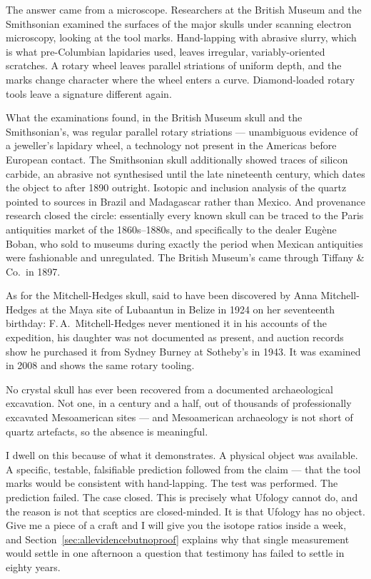 The answer came from a microscope. Researchers at the British Museum and the Smithsonian examined the
surfaces of the major skulls under scanning electron microscopy, looking at the tool marks.  Hand-lapping with
abrasive slurry, which is what pre-Columbian lapidaries used, leaves irregular, variably-oriented
scratches. A rotary wheel leaves parallel striations of uniform depth, and the marks change character
where the wheel enters a curve. Diamond-loaded rotary tools leave a signature different again.

What the examinations found, in the British Museum skull and the Smithsonian's, was regular parallel
rotary striations --- unambiguous evidence of a jeweller's lapidary wheel, a technology not present
in the Americas before European contact. The Smithsonian skull additionally showed traces of silicon
carbide, an abrasive not synthesised until the late nineteenth century, which dates the object to
after 1890 outright. Isotopic and inclusion analysis of the quartz pointed to sources in Brazil and
Madagascar rather than Mexico. And provenance research closed the circle: essentially every known
skull can be traced to the Paris antiquities market of the 1860s--1880s, and specifically to the
dealer Eugène Boban, who sold to museums during exactly the period when Mexican antiquities were
fashionable and unregulated. The British Museum's came through Tiffany \& Co.\ in 1897.

As for the Mitchell-Hedges skull, said to have been discovered by Anna Mitchell-Hedges at the Maya
site of Lubaantun in Belize in 1924 on her seventeenth birthday: F.\,A.\ Mitchell-Hedges never
mentioned it in his accounts of the expedition, his daughter was not documented as present, and
auction records show he purchased it from Sydney Burney at Sotheby's in 1943. It was examined in 2008
and shows the same rotary tooling.

No crystal skull has ever been recovered from a documented archaeological excavation. Not one, in a
century and a half, out of thousands of professionally excavated Mesoamerican sites --- and
Mesoamerican archaeology is not short of quartz artefacts, so the absence is meaningful.

I dwell on this because of what it demonstrates. A physical object was available. A specific,
testable, falsifiable prediction followed from the claim --- that the tool marks would be consistent
with hand-lapping. The test was performed. The prediction failed. The case closed. This is precisely
what Ufology cannot do, and the reason is not that sceptics are closed-minded. It is that Ufology has
no object. Give me a piece of a craft and I will give you the isotope ratios inside a week, and
Section~\ref{sec:allevidencebutnoproof} explains why that single measurement would settle in one afternoon a question that
testimony has failed to settle in eighty years.

